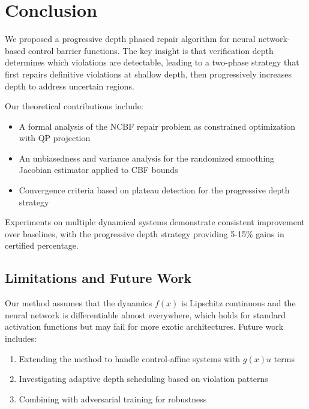 \section{Conclusion}

We proposed a progressive depth phased repair algorithm for neural network-based control barrier functions. The key insight is that verification depth determines which violations are detectable, leading to a two-phase strategy that first repairs definitive violations at shallow depth, then progressively increases depth to address uncertain regions.

Our theoretical contributions include:
\begin{itemize}
    \item A formal analysis of the NCBF repair problem as constrained optimization with QP projection
    \item An unbiasedness and variance analysis for the randomized smoothing Jacobian estimator applied to CBF bounds
    \item Convergence criteria based on plateau detection for the progressive depth strategy
\end{itemize}

Experiments on multiple dynamical systems demonstrate consistent improvement over baselines, with the progressive depth strategy providing 5-15\% gains in certified percentage.

\subsection{Limitations and Future Work}

Our method assumes that the dynamics $f(x)$ is Lipschitz continuous and the neural network is differentiable almost everywhere, which holds for standard activation functions but may fail for more exotic architectures. Future work includes:
\begin{enumerate}
    \item Extending the method to handle control-affine systems with $g(x)u$ terms
    \item Investigating adaptive depth scheduling based on violation patterns
    \item Combining with adversarial training for robustness
\end{enumerate}